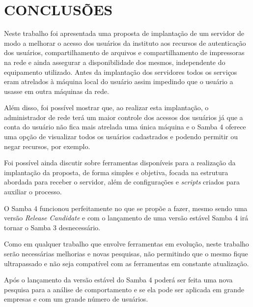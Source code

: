 \chapter{CONCLUSÕES}

Neste trabalho foi apresentada uma proposta de implantação de um servidor de modo a melhorar o acesso dos usuários da instituto aos recursos de autenticação dos usuários, compartilhamento de arquivos e compartilhamento de impressoras na rede e ainda assegurar a disponibilidade dos mesmos, independente do equipamento utilizado. Antes da implantação dos servidores todos os serviços eram atrelados à máquina local do usuário assim impedindo que o usuário a usasse em outra máquinas da rede.

Além disso, foi possível mostrar que, ao realizar esta implantação, o administrador de rede terá um maior controle dos acessos dos usuários já que a conta do usuário não fica mais atrelada uma única máquina e o Samba 4 oferece uma opção de visualizar todos os usuários cadastrados e podendo permitir ou negar recursos, por exemplo.

Foi possível ainda discutir sobre ferramentas disponíveis para a realização da implantação da proposta, de forma simples e objetiva, focada na estrutura abordada para receber o servidor, além de configurações e \textit{scripts} criados para auxiliar o processo.

O Samba 4 funcionou perfeitamente no que se propõe a fazer, mesmo sendo uma versão \textit{Release Candidate} e com o lançamento de uma versão estável Samba 4 irá tornar o Samba 3 desnecessário.

Como em qualquer trabalho que envolve ferramentas em evolução, neste trabalho serão necessárias melhorias e novas pesquisas, não permitindo que o mesmo fique ultrapassado e não seja compatível com as ferramentas em constante atualização.

Após o lançamento da versão estável do Samba 4 poderá ser feita uma nova pesquisa para a análise de comportamento e se ela pode ser aplicada em grande empresas e com um grande número de usuários.



